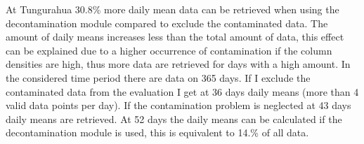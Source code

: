 \documentclass  [
  paper    = a4,
  BCOR     = 10mm,
  twoside,
  fontsize = 12pt,
  fleqn,
  toc      = bibnumbered,
  toc      = listofnumbered,
  numbers  = noendperiod,
  headings = normal,
  listof   = leveldown,
  version  = 3.03
]                                       {scrreprt}
\begin{document}
	At Tungurahua 30.8\% more daily mean data can be retrieved when using the decontamination module compared to exclude the contaminated data. The amount of daily means increases less than the total amount of data, this effect can be explained due to a higher occurrence of contamination if the   column densities are high, thus more data are retrieved for days with a high   amount.
	In the considered time period there are data on 365 days. 
	If I exclude the contaminated data from the evaluation I get at 36 days daily means (more than 4 valid data points per day). If the contamination problem is neglected at 43 days daily means are retrieved. At 52 days the daily means can be calculated if the decontamination module is used, this is equivalent to 14.\% of all data.\\
\end{document}
